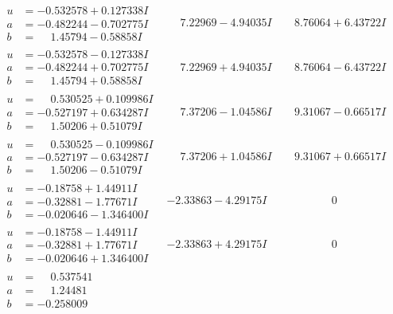 \documentclass[1p]{elsarticle_modified}
\theoremstyle{definition}
\begin{document}
$$\begin{array}{c|c|c}
\begin{aligned}
u &= -0.532578 + 0.127338 I \\
a &= -0.482244 - 0.702775 I \\
b &= \phantom{-}1.45794 - 0.58858 I\end{aligned}
 & \phantom{-}7.22969 - 4.94035 I & \phantom{-}8.76064 + 6.43722 I \\ \hline\begin{aligned}
u &= -0.532578 - 0.127338 I \\
a &= -0.482244 + 0.702775 I \\
b &= \phantom{-}1.45794 + 0.58858 I\end{aligned}
 & \phantom{-}7.22969 + 4.94035 I & \phantom{-}8.76064 - 6.43722 I \\ \hline\begin{aligned}
u &= \phantom{-}0.530525 + 0.109986 I \\
a &= -0.527197 + 0.634287 I \\
b &= \phantom{-}1.50206 + 0.51079 I\end{aligned}
 & \phantom{-}7.37206 - 1.04586 I & \phantom{-}9.31067 - 0.66517 I \\ \hline\begin{aligned}
u &= \phantom{-}0.530525 - 0.109986 I \\
a &= -0.527197 - 0.634287 I \\
b &= \phantom{-}1.50206 - 0.51079 I\end{aligned}
 & \phantom{-}7.37206 + 1.04586 I & \phantom{-}9.31067 + 0.66517 I \\ \hline\begin{aligned}
u &= -0.18758 + 1.44911 I \\
a &= -0.32881 - 1.77671 I \\
b &= -0.020646 - 1.346400 I\end{aligned}
 & -2.33863 - 4.29175 I & \phantom{-0.000000 } 0 \\ \hline\begin{aligned}
u &= -0.18758 - 1.44911 I \\
a &= -0.32881 + 1.77671 I \\
b &= -0.020646 + 1.346400 I\end{aligned}
 & -2.33863 + 4.29175 I & \phantom{-0.000000 } 0 \\ \hline\begin{aligned}
u &= \phantom{-}0.537541\phantom{ +0.000000I} \\
a &= \phantom{-}1.24481\phantom{ +0.000000I} \\
b &= -0.258009\phantom{ +0.000000I}\end{aligned}

\end{array}$$
\end{document}
